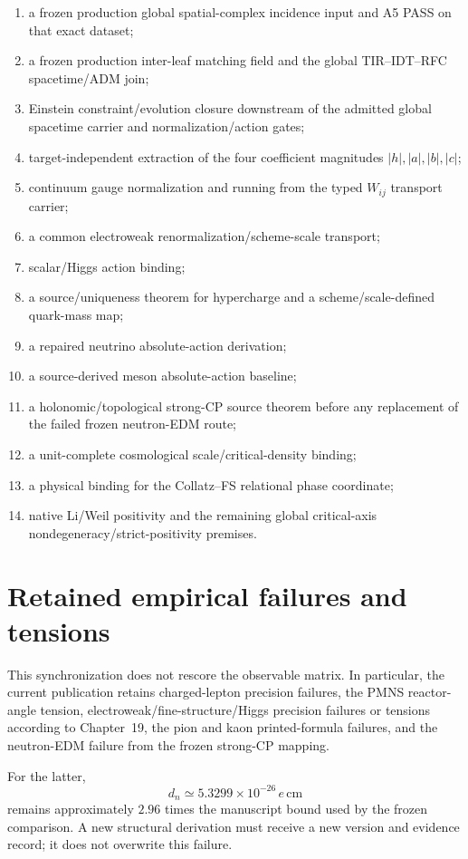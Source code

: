 \begin{enumerate}
\item a frozen production global spatial-complex incidence input and A5 PASS on
that exact dataset;
\item a frozen production inter-leaf matching field and the global TIR--IDT--RFC
spacetime/ADM join;
\item Einstein constraint/evolution closure downstream of the admitted global
spacetime carrier and normalization/action gates;
\item target-independent extraction of the four coefficient magnitudes
\(|h|,|a|,|b|,|c|\);
\item continuum gauge normalization and running from the typed \(W_{ij}\)
transport carrier;
\item a common electroweak renormalization/scheme-scale transport;
\item scalar/Higgs action binding;
\item a source/uniqueness theorem for hypercharge and a scheme/scale-defined
quark-mass map;
\item a repaired neutrino absolute-action derivation;
\item a source-derived meson absolute-action baseline;
\item a holonomic/topological strong-CP source theorem before any replacement
of the failed frozen neutron-EDM route;
\item a unit-complete cosmological scale/critical-density binding;
\item a physical binding for the Collatz--FS relational phase coordinate;
\item native Li/Weil positivity and the remaining global critical-axis
nondegeneracy/strict-positivity premises.
\end{enumerate}

\section{Retained empirical failures and tensions}

This synchronization does not rescore the observable matrix.  In particular,
the current publication retains charged-lepton precision failures, the PMNS
reactor-angle tension, electroweak/fine-structure/Higgs precision failures or
tensions according to Chapter~19, the pion and kaon printed-formula failures,
and the neutron-EDM failure from the frozen strong-CP mapping.

For the latter,
\[
d_n\simeq5.3299\times10^{-26}\,e\,\mathrm{cm}
\]
remains approximately \(2.96\) times the manuscript bound used by the frozen
comparison.  A new structural derivation must receive a new version and evidence
record; it does not overwrite this failure.

